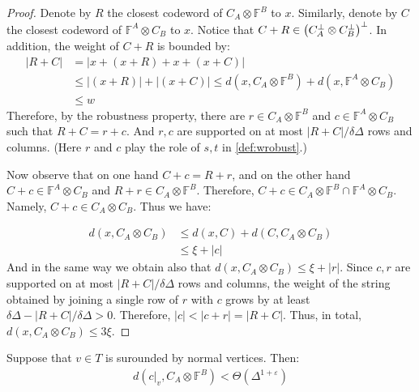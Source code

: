  \begin{proof}
Denote by $R$ the closest codeword of $C_{A}\otimes\mathbb{F}^{B}$ to $x$. Similarly, denote by $C$ the closest codeword of $\mathbb{F}^{A} \otimes C_{B}$ to $x$. Notice that $C + R \in \left( C_{A}^{\perp}\otimes C_{B}^{\perp} \right)^{\perp}$. In addition, the weight of $C+R$ is bounded by:
   \begin{equation*}
     \begin{split}
       |R + C| &=  |x + \left(x + R\right) + x + \left( x + C\right)| \\
       & \le |\left(x + R\right)|+ |\left( x + C\right)| \le d\left( x ,   C_{A}\otimes\mathbb{F}^{B} \right) +  d\left( x ,   \mathbb{F}^{A} \otimes C_{B} \right) \\ 
       & \le w
     \end{split}
   \end{equation*}
   Therefore, by the robustness property, there are $r \in C_{A}\otimes\mathbb{F}^{B}$ and $c \in \mathbb{F}^{A} \otimes C_{B} $ such that $ R + C  = r + c$. And $r,c$ are supported on at most $|R+C|/\delta\Delta$ rows and columns. (Here $r$ and $c$ play the role of $s,t$ in \cref{def:wrobust}.)  

   Now observe that on one hand $C + c = R + r$, and on the other hand $ C + c \in \mathbb{F}^{A} \otimes C_{B} $ and $R+r \in C_{A}\otimes\mathbb{F}^{B}$. Therefore, $C+c \in C_{A}\otimes\mathbb{F}^{B} \cap \mathbb{F}^{A} \otimes C_{B}$. Namely, $C +c \in C_{A} \otimes C_{B}$. Thus we have:  
   
   \begin{equation*}
     \begin{split}
       d\left(x, C_{A}\otimes C_{B}\right) & \le d\left(x, C\right) + d\left(C, C_{A}\otimes C_{B} \right) \\
       &\le \xi + |c|
     \end{split}
   \end{equation*}
   And in the same way we obtain also that $d\left( x, C_{A} \otimes C_{B} \right) \le \xi + |r|$. Since $c,r$ are supported on at most $|R+C|/\delta\Delta$ rows and columns, the weight of the string obtained by joining a single row of $r$ with $c$ grows by at least $\delta\Delta - |R+C|/\delta\Delta > 0$. Therefore, $|c| < |c + r| = |R + C|$. Thus, in total, $d\left( x, C_{A} \otimes C_{B} \right) \le 3\xi$.
 \end{proof}
\begin{claim}
  Suppose that $v \in T$ is surounded by normal vertices. Then:
  \begin{equation*}
    \begin{split}
      d\left( c|_{v}, C_{A} \otimes \mathbb{F}^{B}\right) < \Theta\left( \Delta^{1+\varepsilon} \right)
    \end{split}
  \end{equation*} 
 \end{claim}
